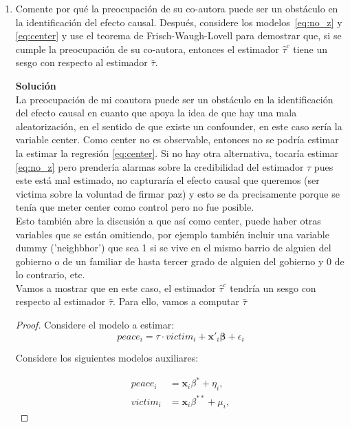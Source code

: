 \documentclass[a4paper, answers, addpoints, 11pt]{exam}
\begin{document}
\begin{enumerate} [resume]
    \item Comente por qué la preocupación de su co-autora puede ser un obstáculo en la identificación del efecto causal. Después, considere los modelos~\eqref{eq:no_z} y \eqref{eq:center} y use el teorema de Frisch-Waugh-Lovell para demostrar que, si se cumple la preocupación de su co-autora, entonces el estimador $\hat\tau^c$ tiene un sesgo con respecto al estimador $\hat\tau$.

  \begin{mdframed}
        \textbf{Solución}\\
        La preocupación de mi coautora puede ser un obstáculo en la identificación del efecto causal en cuanto que apoya la idea de que hay una mala aleatorización, en el sentido de que existe un confounder, en este caso sería la variable center. Como center no es observable, entonces no se podría estimar la  estimar la regresión \eqref{eq:center}. Si no hay otra alternativa, tocaría estimar \ref{eq:no_z} pero prendería alarmas sobre la credibilidad del estimador $\tau$ pues este está mal estimado, no capturaría el efecto causal que queremos (ser victima sobre la voluntad de firmar paz) y esto se da precisamente porque se tenía que meter center como control pero no fue posible. \\
        Esto también abre la discusión a que así como center, puede haber otras variables que se están omitiendo, por ejemplo también incluir una variable dummy ('neighbhor') que sea 1 si se vive en el mismo barrio de alguien del gobierno o de un familiar de hasta tercer grado de alguien del gobierno y 0 de lo contrario, etc.\\
        
    Vamos a mostrar que en este caso, el estimador  $\hat\tau^c$ tendría un sesgo con respecto al estimador $\hat\tau$. Para ello, vamos a computar $\hat\tau$
    \begin{proof}
Considere el modelo a estimar:
\begin{equation*} 
    peace_i = \tau \cdot victim_i + \textbf{x}'_i\boldsymbol\beta + \epsilon_i
\end{equation*}

Considere los siguientes modelos auxiliares:

\begin{align*}
    peace_i &= \textbf{x}_i \beta^{*} + \eta_i, \\
    victim_i &= \textbf{x}_i\beta^{**} + \mu_i,
\end{align*}


\end{proof}
\end{mdframed}
\end{enumerate}
\end{document}
